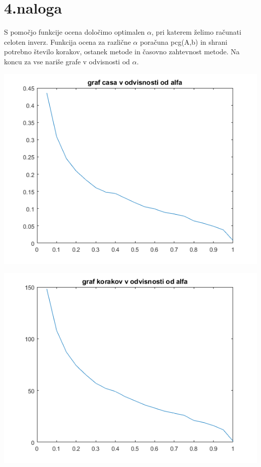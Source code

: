\documentclass[11pt]{article} %
\begin{document}
\section{4.naloga}

S pomočjo funkcije ocena določimo optimalen $\alpha$, pri katerem želimo računati celoten inverz. Funkcija ocena za različne $\alpha$ poračuna pcg(A,b) in shrani potrebno število korakov, ostanek metode in časovno zahtevnost metode. Na koncu za vse nariše grafe v odvisnosti od $\alpha$. 

\begin{centering}
\includegraphics[scale=0.4]{cas}
\end{centering}

\begin{centering}
\includegraphics[scale=0.4]{koraki}
\end{centering}
\end{document}
